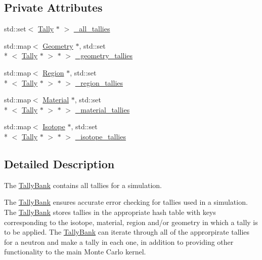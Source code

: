 \subsection*{Private Attributes}
\begin{DoxyCompactItemize}
\item 
std\-::set$<$ \hyperlink{classTally}{Tally} $\ast$ $>$ \hyperlink{classTallyBank_a70424c03332fd144a06d4a0b25426fb3}{\-\_\-all\-\_\-tallies}
\item 
std\-::map$<$ \hyperlink{classGeometry}{Geometry} $\ast$, std\-::set\\*
$<$ \hyperlink{classTally}{Tally} $\ast$ $>$ $\ast$ $>$ \hyperlink{classTallyBank_a29eb48c6c05829ac572782ab65d224d4}{\-\_\-geometry\-\_\-tallies}
\item 
std\-::map$<$ \hyperlink{classRegion}{Region} $\ast$, std\-::set\\*
$<$ \hyperlink{classTally}{Tally} $\ast$ $>$ $\ast$ $>$ \hyperlink{classTallyBank_a10180395facd4f1d39d8aa7cf81c6789}{\-\_\-region\-\_\-tallies}
\item 
std\-::map$<$ \hyperlink{classMaterial}{Material} $\ast$, std\-::set\\*
$<$ \hyperlink{classTally}{Tally} $\ast$ $>$ $\ast$ $>$ \hyperlink{classTallyBank_abb5dff298a205ff6bb3aeae5851e78ae}{\-\_\-material\-\_\-tallies}
\item 
std\-::map$<$ \hyperlink{classIsotope}{Isotope} $\ast$, std\-::set\\*
$<$ \hyperlink{classTally}{Tally} $\ast$ $>$ $\ast$ $>$ \hyperlink{classTallyBank_a9d5bb358e7a434a6b6b6a9239a0af353}{\-\_\-isotope\-\_\-tallies}
\end{DoxyCompactItemize}


\subsection{Detailed Description}
The \hyperlink{classTallyBank}{Tally\-Bank} contains all tallies for a simulation. 

The \hyperlink{classTallyBank}{Tally\-Bank} ensures accurate error checking for tallies used in a simulation. The \hyperlink{classTallyBank}{Tally\-Bank} stores tallies in the appropriate hash table with keys corresponding to the isotope, material, region and/or geometry in which a tally is to be applied. The \hyperlink{classTallyBank}{Tally\-Bank} can iterate through all of the approrpirate tallies for a neutron and make a tally in each one, in addition to providing other functionality to the main Monte Carlo kernel. 

